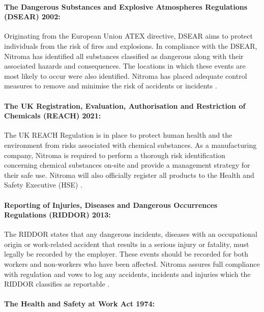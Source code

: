 \paragraph{The Dangerous Substances and Explosive Atmospheres Regulations (DSEAR) 2002:}

Originating from the European Union ATEX directive, DSEAR aims to protect individuals from the risk of fires and explosions. In compliance with the DSEAR, Nitroma has identified all substances classified as dangerous along with their associated hazards and consequences. The locations in which these events are most likely to occur were also identified. Nitroma has placed adequate control measures to remove and minimise the risk of accidents or incidents \cite{health_and_safety_executive_dangerous_nodate}. 

\paragraph{The UK Registration, Evaluation, Authorisation and Restriction of Chemicals (REACH) 2021:}

The UK REACH Regulation is in place to protect human health and the environment from risks associated with chemical substances. As a manufacturing company, Nitroma is required to perform a thorough risk identification concerning chemical substances on-site and provide a management strategy for their safe use. Nitroma will also officially register all products to the Health and Safety Executive (HSE) \cite{health_and_safety_executive_uk_nodate}. 

\paragraph{Reporting of Injuries, Diseases and Dangerous Occurrences Regulations (RIDDOR) 2013:}

The RIDDOR states that any dangerous incidents, diseases with an occupational origin or work-related accident that results in a serious injury or fatality, must legally be recorded by the employer. These events should be recorded for both workers and non-workers who have been affected. Nitroma assures full compliance with regulation and vows to log any accidents, incidents and injuries which the RIDDOR classifies as reportable \cite{health_and_safety_executive_reporting_2013}.

\paragraph{The Health and Safety at Work Act 1974:}

